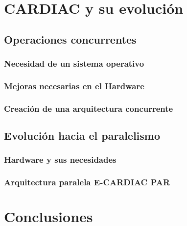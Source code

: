 \documentclass[letterpaper,12pt,oneside]{book}
\begin{document}
\chapter{CARDIAC y su evolución}  %
	\section{Operaciones concurrentes}
	
		\subsection{Necesidad de un sistema operativo}
		
		\subsection{Mejoras necesarias en el Hardware}
		
		\subsection{Creación de una arquitectura concurrente}
	
	 \section{Evolución hacia el paralelismo}
	 
	 	\subsection{Hardware y sus necesidades}
	 	
	 	\subsection{Arquitectura paralela E-CARDIAC PAR}


\chapter{Conclusiones}

\newpage

	
	

\end{document}
